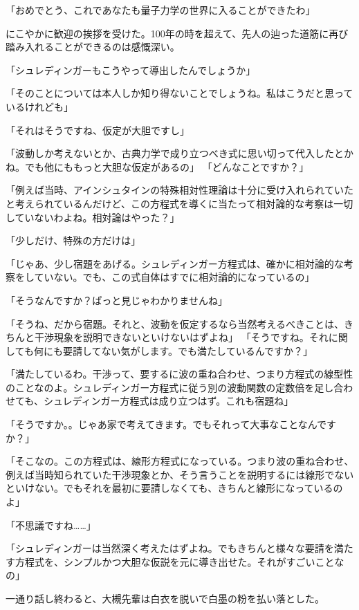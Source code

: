 \documentclass[a4paper,dvipdfmx,12pt]{jsarticle}
\begin{document}
「おめでとう、これであなたも量子力学の世界に入ることができたわ」

にこやかに歓迎の挨拶を受けた。100年の時を超えて、先人の辿った道筋に再び踏み入れることができるのは感慨深い。

「シュレディンガーもこうやって導出したんでしょうか」

「そのことについては本人しか知り得ないことでしょうね。私はこうだと思っているけれども」

「それはそうですね、仮定が大胆ですし」

「波動しか考えないとか、古典力学で成り立つべき式に思い切って代入したとかね。でも他にももっと大胆な仮定があるの」
「どんなことですか？」

「例えば当時、アインシュタインの特殊相対性理論は十分に受け入れられていたと考えられているんだけど、この方程式を導くに当たって相対論的な考察は一切していないわよね。相対論はやった？」

「少しだけ、特殊の方だけは」

「じゃあ、少し宿題をあげる。シュレディンガー方程式は、確かに相対論的な考察をしていない。でも、この式自体はすでに相対論的になっているの」

「そうなんですか？ぱっと見じゃわかりませんね」

「そうね、だから宿題。それと、波動を仮定するなら当然考えるべきことは、きちんと干渉現象を説明できないといけないはずよね」
「そうですね。それに関しても何にも要請してない気がします。でも満たしているんですか？」

「満たしているわ。干渉って、要するに波の重ね合わせ、つまり方程式の線型性のことなのよ。シュレディンガー方程式に従う別の波動関数の定数倍を足し合わせても、シュレディンガー方程式は成り立つはず。これも宿題ね」

「そうですか。。じゃあ家で考えてきます。でもそれって大事なことなんですか？」

「そこなの。この方程式は、線形方程式になっている。つまり波の重ね合わせ、例えば当時知られていた干渉現象とか、そう言うことを説明するには線形でないといけない。でもそれを最初に要請しなくても、きちんと線形になっているのよ」

「不思議ですね……」

「シュレディンガーは当然深く考えたはずよね。でもきちんと様々な要請を満たす方程式を、シンプルかつ大胆な仮説を元に導き出せた。それがすごいことなの」

\vspace{0.2in}

一通り話し終わると、大槻先輩は白衣を脱いで白墨の粉を払い落とした。
\end{document}
